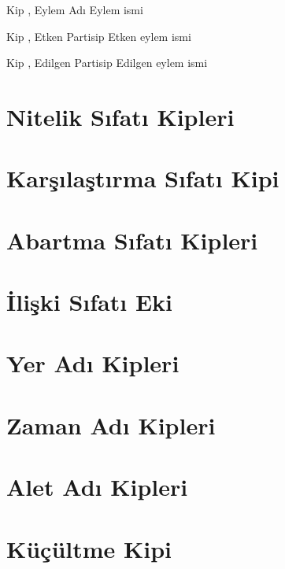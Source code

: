 \begin{kip}{}{Kip , Eylem Adı}
  Eylem ismi
\end{kip}

\begin{kip}{}{Kip , Etken Partisip}
  Etken eylem ismi
\end{kip}

\begin{kip}{}{Kip , Edilgen Partisip}
  Edilgen eylem ismi
\end{kip}



\section{Nitelik Sıfatı Kipleri}

\section{Karşılaştırma Sıfatı Kipi}

\section{Abartma Sıfatı Kipleri}

\section{İlişki Sıfatı Eki}

\section{Yer Adı Kipleri}

\section{Zaman Adı Kipleri}

\section{Alet Adı Kipleri}

\section{Küçültme Kipi}






